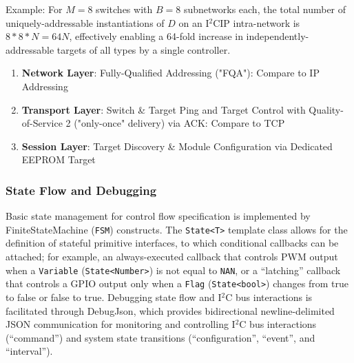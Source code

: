 \documentclass{../tex/report}
\begin{document}
\hspace{24pt} Example: For $M = 8$ switches with $B = 8$ subnetworks each, the total number of uniquely-addressable instantiations of $D$ on an I${}^2$CIP intra-network is $8 * 8 * N = 64N$, effectively enabling a 64-fold increase in independently-addressable targets of all types by a single controller.


\begin{enumerate}[label=SC\arabic*., ref=SC\arabic*, resume]
    \item\label{sc:3} \textbf{Network Layer}: Fully-Qualified Addressing ("FQA"): Compare to IP Addressing
    \item\label{sc:4} \textbf{Transport Layer}: Switch \& Target Ping and Target Control with Quality-of-Service 2 ("only-once" delivery) via ACK: Compare to TCP
    \item\label{sc:5} \textbf{Session Layer}: Target Discovery \& Module Configuration via Dedicated EEPROM Target
\end{enumerate}






\clearpage

\subsubsection{State Flow and Debugging}

\hspace{24pt} Basic state management for control flow specification is implemented by FiniteStateMachine (\texttt{FSM}) constructs. The \texttt{State<T>} template class allows for the definition of stateful primitive interfaces, to which conditional callbacks can be attached; for example, an always-executed callback that controls PWM output when a \texttt{Variable} (\texttt{State<Number>}) is not equal to \texttt{NAN}, or a ``latching'' callback that controls a GPIO output only when a \texttt{Flag} (\texttt{State<bool>}) changes from true to false or false to true. Debugging state flow and I$^2$C bus interactions is facilitated through DebugJson, which provides bidirectional newline-delimited JSON communication for monitoring and controlling I$^2$C bus interactions (``command'') and system state transitions (``configuration'', ``event'', and ``interval'').
\end{document}
